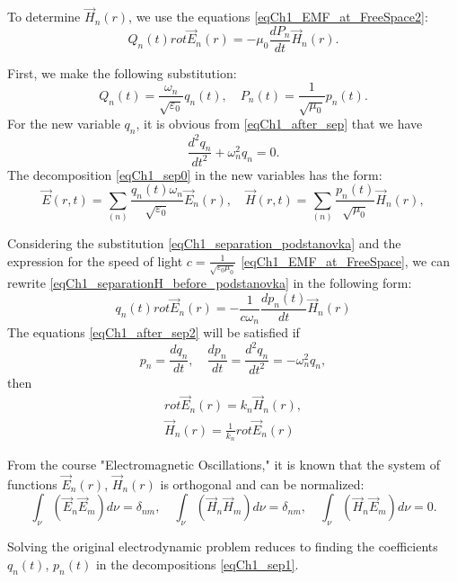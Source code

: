 To determine $\vec{H}_n\left(r\right)$, we use the equations 
\eqref{eqCh1_EMF_at_FreeSpace2}:
\begin{equation}
Q_n\left(t\right)  rot
\vec{E}_n\left(r\right) = -\mu_0 \frac{d P_n}{d t}
\vec{H}_n\left(r\right).
\label{eqCh1_separationH_before_podstanovka}
\end{equation}

First, we make the following substitution:
\begin{equation}
Q_n\left(t\right) = \frac{\omega_n}{\sqrt{\varepsilon_0}}q_n\left(t\right),
\quad
P_n\left(t\right) = \frac{1}{\sqrt{\mu_0}}p_n\left(t\right).
\label{eqCh1_separation_podstanovka}
\end{equation}
For the new variable $q_n$, it is obvious from \eqref{eqCh1_after_sep} that we have
\[
\frac{d^2 q_n}{d t^2} + \omega_n^2 q_n = 0.
\]
The decomposition \eqref{eqCh1_sep0} in the new variables has the form:
\begin{equation}
\vec{E}\left(r, t\right) = \sum_{(n)}
\frac{q_n\left(t\right) \omega_n}{\sqrt{\varepsilon_0}} \vec{E}_n\left(r\right),
\quad
\vec{H}\left(r, t\right) = \sum_{(n)}
\frac{p_n\left(t\right)}{\sqrt{\mu_0}} \vec{H}_n\left(r\right),
\label{eqCh1_sep1}
\end{equation}

Considering the substitution \eqref{eqCh1_separation_podstanovka} and the expression for the speed of light $c =   \frac{1}{\sqrt{\varepsilon_0 \mu_0}}$
\eqref{eqCh1_EMF_at_FreeSpace}, we can rewrite 
\eqref{eqCh1_separationH_before_podstanovka} in the following form:
\begin{equation}
q_n\left(t\right) rot \vec{E}_n\left(r\right) = - \frac{1}{c \omega_n}
\frac{d p_n\left(t\right)}{d t} \vec{H}_n\left(r\right)
\label{eqCh1_after_sep2}
\end{equation}
The equations \eqref{eqCh1_after_sep2} will be satisfied if 
\[
p_n = \frac{d q_n}{d t}, \quad \frac{d p_n}{d t} = 
\frac{d^2 q_n}{d t^2} = - \omega_n^2 q_n,
\]
then
\begin{eqnarray}
rot \vec{E}_n\left(r\right) = k_n \vec{H}_n\left(r\right),
\nonumber \\
\vec{H}_n\left(r\right) =  \frac{1}{k_n} rot \vec{E}_n\left(r\right)
\end{eqnarray}

From the course "Electromagnetic Oscillations," it is known that the system of functions  
$\vec{E}_n\left(r\right)$, $\vec{H}_n\left(r\right)$ is orthogonal and
can be normalized:
\begin{equation}
\int_{\nu} \left( \vec{E}_n \vec{E}_m \right) d \nu = \delta_{nm},
\quad
\int_{\nu} \left( \vec{H}_n \vec{H}_m \right) d \nu = \delta_{nm},
\quad
\int_{\nu} \left( \vec{H}_n \vec{E}_m \right) d \nu = 0.
\label{eqCh1_task1}
\end{equation}

Solving the original electrodynamic problem reduces to finding
the coefficients  $q_n\left(t\right)$, $p_n\left(t\right)$    
in the decompositions \eqref{eqCh1_sep1}.